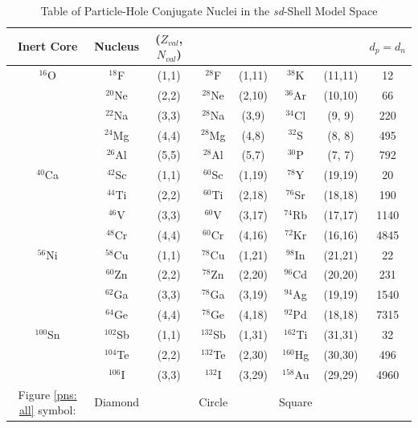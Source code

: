 \begin{table}
    \caption{Table of Particle-Hole Conjugate Nuclei in the \textit{sd}-Shell Model Space}
    \label{tbl: log}

\begin{tabular}
    {c | c c c c c c c}
    \hline 
    \hline
Inert Core & Nucleus & ($Z_{val}$, $N_{val}$) &  &  &  &  & $d_p=d_n$ \\
 
    \hline
$^{16}$O    &$^{18}$F   &(1,1)   & $^{28}$F   &(1,11) & $^{38}$K   &(11,11) & 12 \\
       &$^{20}$Ne  &(2,2)   & $^{28}$Ne  &(2,10) & $^{36}$Ar  &(10,10) & 66\\
       &$^{22}$Na  &(3,3)   & $^{28}$Na  &(3,9)  & $^{34}$Cl  & (9, 9) & 220\\
       &$^{24}$Mg  &(4,4)   & $^{28}$Mg  &(4,8)  & $^{32}$S   & (8, 8) & 495\\
       &$^{26}$Al  &(5,5)   & $^{28}$Al  &(5,7)  & $^{30}$P   & (7, 7) & 792\\
\hline                                                                          
$^{40}$Ca   &$^{42}$Sc  &(1,1)   & $^{60}$Sc  &(1,19) & $^{78}$Y   &(19,19) & 20 \\
       &$^{44}$Ti  &(2,2)   & $^{60}$Ti  &(2,18) & $^{76}$Sr  &(18,18) & 190 \\
       &$^{46}$V   &(3,3)   & $^{60}$V   &(3,17) & $^{74}$Rb  &(17,17) & 1140 \\
       &$^{48}$Cr  &(4,4)   & $^{60}$Cr  &(4,16) & $^{72}$Kr  &(16,16) & 4845 \\
\hline
$^{56}$Ni    &$^{58}$Cu  &(1,1)   & $^{78}$Cu  &(1,21) & $^{98}$In  &(21,21) & 22 \\
       &$^{60}$Zn  &(2,2)   & $^{78}$Zn  &(2,20) & $^{96}$Cd  &(20,20) & 231 \\
       &$^{62}$Ga  &(3,3)   & $^{78}$Ga  &(3,19) & $^{94}$Ag  &(19,19) & 1540 \\
       &$^{64}$Ge  &(4,4)   & $^{78}$Ge  &(4,18) & $^{92}$Pd  &(18,18) & 7315 \\
\hline
$^{100}$Sn  &$^{102}$Sb &(1,1)   & $^{132}$Sb &(1,31) & $^{162}$Ti &(31,31) & 32 \\
       &$^{104}$Te &(2,2)   & $^{132}$Te &(2,30) & $^{160}$Hg &(30,30) & 496 \\
       &$^{106}$I  &(3,3)   & $^{132}$I  &(3,29) & $^{158}$Au &(29,29) & 4960 \\
Figure \ref{pns: all} symbol: & Diamond && Circle && Square \\
    \hline
    \hline
\end{tabular}

\end{table} 

